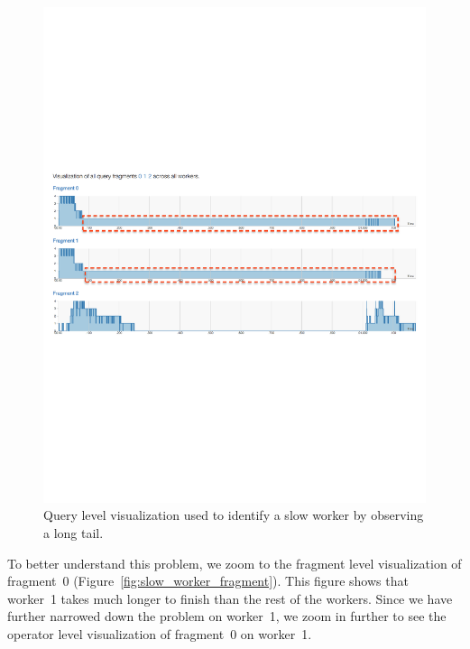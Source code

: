 \documentclass[11pt]{scrartcl}
\begin{document}
\begin{figure}[h]
  \begin{center}
    \includegraphics[width=\textwidth]{slow_worker_overview.pdf}
  \end{center}
  \caption{Query level visualization used to identify a slow worker by observing a long tail.}
  \label{fig:slow_worker_overview}
\end{figure}

To better understand this problem, we zoom to the fragment level visualization of fragment~0 (Figure~\ref{fig:slow_worker_fragment}). This figure shows that worker~1 takes much longer to finish than the rest of the workers. Since we have further narrowed down the problem on worker~1, we zoom in further to see the operator level visualization of fragment~0 on worker~1.
\end{document}
